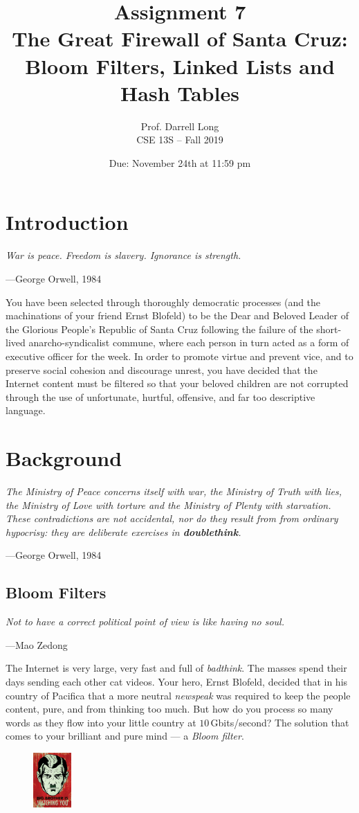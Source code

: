 \documentclass{article}
\title{Assignment 7\\The Great Firewall of Santa Cruz:\\Bloom Filters,
Linked Lists and Hash Tables}
\author{Prof. Darrell Long \\
CSE 13S -- Fall 2019}
\date{Due: November 24th at 11:59 pm}
\begin{document}
\maketitle

\section{Introduction}
\textwidth \epigraph{\emph{War is peace. Freedom
is slavery. Ignorance is strength.}}{ ---George Orwell, 1984}

\noindent
You have been selected through thoroughly democratic processes (and the
machinations of your friend Ernst Blofeld) to be the Dear and Beloved Leader
of the Glorious People's Republic of Santa Cruz following the failure of the
short-lived anarcho-syndicalist commune, where each person in turn acted as
a form of executive officer for the week. In order to promote virtue and
prevent vice, and to preserve social cohesion and discourage unrest, you have
decided that the Internet content must be filtered so that your beloved
children are not corrupted through the use of unfortunate, hurtful, offensive,
and far too descriptive language.

\section{Background}

\textwidth
\epigraph{\emph{The Ministry of Peace concerns itself with war, the Ministry
of Truth with lies, the Ministry of Love with torture and the Ministry of
Plenty with starvation. These contradictions are not accidental, nor do they
result from from ordinary hypocrisy: they are deliberate exercises in
\textbf{doublethink}.}}{---George Orwell, 1984}

\subsection{Bloom Filters}
\epigraph{\emph{Not to have a correct political point of view is like having
no soul.}}{---Mao Zedong}

\noindent
The Internet is very large, very fast and full of \emph{badthink}. The masses
spend their days sending each other cat videos. Your hero, Ernst Blofeld,
decided that in his country of Pacifica that a more neutral \emph{newspeak}
was required to keep the people content, pure, and from thinking
too much. But how do you process so many words as they flow into
your little country at $10\,$Gbits/second? The solution that comes to
your brilliant and pure mind --- a \emph{Bloom filter}.
\begin{figure}
\centering
\includegraphics[width=0.130\textwidth]{1984-Big-Brother.jpg}
\end{figure}
\end{document}
